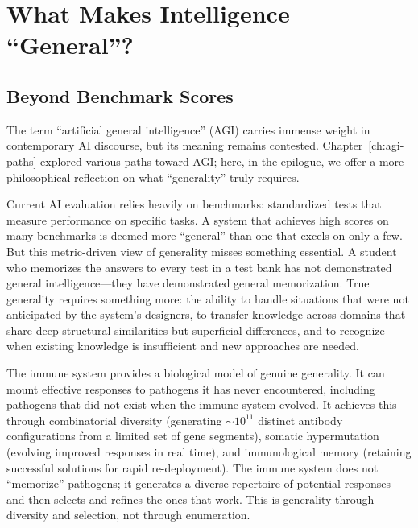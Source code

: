\section{What Makes Intelligence ``General''?}
\label{sec:general-intelligence}

\subsection{Beyond Benchmark Scores}

The term ``artificial general intelligence'' (AGI) carries immense weight in contemporary AI discourse, but its meaning remains contested. Chapter~\ref{ch:agi-paths} explored various paths toward AGI; here, in the epilogue, we offer a more philosophical reflection on what ``generality'' truly requires.

Current AI evaluation relies heavily on benchmarks: standardized tests that measure performance on specific tasks. A system that achieves high scores on many benchmarks is deemed more ``general'' than one that excels on only a few. But this metric-driven view of generality misses something essential. A student who memorizes the answers to every test in a test bank has not demonstrated general intelligence---they have demonstrated general memorization. True generality requires something more: the ability to handle situations that were not anticipated by the system's designers, to transfer knowledge across domains that share deep structural similarities but superficial differences, and to recognize when existing knowledge is insufficient and new approaches are needed.

\begin{bioinsight}
The immune system provides a biological model of genuine generality. It can mount effective responses to pathogens it has never encountered, including pathogens that did not exist when the immune system evolved. It achieves this through combinatorial diversity (generating $\sim 10^{11}$ distinct antibody configurations from a limited set of gene segments), somatic hypermutation (evolving improved responses in real time), and immunological memory (retaining successful solutions for rapid re-deployment). The immune system does not ``memorize'' pathogens; it generates a diverse repertoire of potential responses and then selects and refines the ones that work. This is generality through diversity and selection, not through enumeration.
\end{bioinsight}

